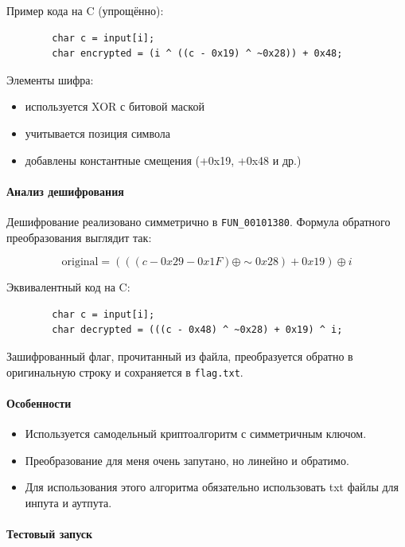     Пример кода на C (упрощённо):
    \begin{verbatim}
        char c = input[i];
        char encrypted = (i ^ ((c - 0x19) ^ ~0x28)) + 0x48;
    \end{verbatim}

    Элементы шифра:
    \begin{itemize}
        \item используется XOR с битовой маской
        \item учитывается позиция символа
        \item добавлены константные смещения (+0x19, +0x48 и др.)
    \end{itemize}

    \paragraph{Анализ дешифрования}

    Дешифрование реализовано симметрично в \texttt{FUN\_00101380}.
    Формула обратного преобразования выглядит так:

    \[
        \text{original} = (((c - 0x29 - 0x1F) \oplus \sim 0x28) + 0x19) \oplus i
    \]

    Эквивалентный код на C:

    \begin{verbatim}
        char c = input[i];
        char decrypted = (((c - 0x48) ^ ~0x28) + 0x19) ^ i;
    \end{verbatim}

    Зашифрованный флаг, прочитанный из файла, преобразуется обратно в оригинальную строку и сохраняется в \texttt{flag.txt}.

    \paragraph{Особенности}

    \begin{itemize}
        \item Используется самодельный криптоалгоритм с симметричным ключом.
        \item Преобразование для меня очень запутано, но линейно и обратимо.
        \item Для использования этого алгоритма обязательно использовать txt файлы для инпута и аутпута.
    \end{itemize}

    \paragraph{Тестовый запуск}


